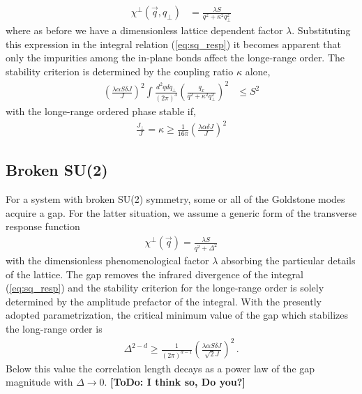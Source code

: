 \documentclass[twocolumn,english,aps,prl,floatfix]{revtex4-1}
\newcommand{\todo}[1]{{\color{red} {\bf [ToDo: #1]}}}
\begin{document}
\begin{equation}
    \begin{aligned}
        \chi^\perp(\vec{q},q_\perp) &= 
        \frac{\lambda S}{q^2+\kappa^2q_\perp^2}
    \end{aligned}
\end{equation}
where as before we have a dimensionless lattice dependent 
factor $\lambda$. Substituting this expression in the integral 
relation (\ref{eq:sq_resp}) it becomes apparent that only the 
impurities among the in-plane bonds affect the longe-range order.
The stability criterion is determined by the coupling ratio 
$\kappa$ alone, 
\begin{equation}
    \begin{aligned}
    \left(\frac{\lambda\alpha S\delta J}{J}\right)^2
    \int \frac{d^2qdq_\perp}{(2\pi)^3}
    \left(\frac{q_x}{q^2+\kappa^2q_\perp^2}\right)^2
        &\leq S^2
    \end{aligned}
\end{equation}
with the longe-range ordered phase stable if,
\begin{equation}
\begin{aligned}
    \frac{J_\perp}{J} = \kappa \geq 
    \frac{1}{16\pi}\left(\frac{\lambda\alpha\delta J}{J}\right)^2
\end{aligned}
\end{equation}

\subsection{Broken SU(2)}

For a system with broken SU(2) symmetry, some or all of the 
Goldstone modes acquire a gap. For the latter situation, we 
assume a generic form of the transverse response function
\begin{align}
    \chi^\perp(\vec{q}) = \frac{\lambda S}{q^2+\Delta^2}
\end{align}
with the dimensionless phenomenological factor $\lambda$
absorbing the particular details of the lattice. The
gap removes the infrared divergence of the integral 
(\ref{eq:sq_resp}) and the stability criterion for the
longe-range order is solely determined by the amplitude 
prefactor of the integral. With the presently adopted
parametrization, the critical minimum value of the gap which
stabilizes the long-range order is
\begin{align}
    \Delta^{2-d} \geq \frac{1}{(2\pi)^{d-1}}
    \left(\frac{\lambda\alpha S\delta J}{\sqrt{2}J}\right)^2\,.
\end{align}
Below this value the correlation length decays as a power law of the
gap magnitude with $\Delta\rightarrow 0$. \todo{I think so, Do you?}
\end{document}
